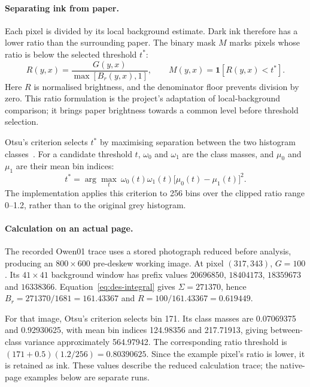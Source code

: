 \paragraph{Separating ink from paper.}
Each pixel is divided by its local background estimate. Dark ink therefore has a lower ratio than the surrounding paper. The binary mask $M$ marks pixels whose ratio is below the selected threshold $t^*$:
\begin{equation}
R(y,x)=\frac{G(y,x)}{\max[B_r(y,x),1]},\qquad
M(y,x)=\mathbf{1}[R(y,x)<t^*].
\label{eq:des-ratio}
\end{equation}
Here $R$ is normalised brightness, and the denominator floor prevents division by zero. This ratio formulation is the project's adaptation of local-background comparison; it brings paper brightness towards a common level before threshold selection.

Otsu's criterion selects $t^*$ by maximising separation between the two histogram classes~\cite{otsu1979}. For a candidate threshold $t$, $\omega_0$ and $\omega_1$ are the class masses, and $\mu_0$ and $\mu_1$ are their mean bin indices:
\begin{equation}
t^*=\arg\max_t\ \omega_0(t)\omega_1(t)
\bigl[\mu_0(t)-\mu_1(t)\bigr]^2.
\label{eq:des-otsu}
\end{equation}
The implementation applies this criterion to 256 bins over the clipped ratio range 0--1.2, rather than to the original grey histogram.

\paragraph{Calculation on an actual page.}
The recorded Owen01 trace uses a stored photograph reduced before analysis, producing an $800\times600$ pre-deskew working image. At pixel $(317,343)$, $G=100$. Its $41\times41$ background window has prefix values $20696850$, $18404173$, $18359673$ and $16338366$. Equation~\ref{eq:des-integral} gives $\Sigma=271370$, hence $B_r=271370/1681=161.43367$ and $R=100/161.43367=0.619449$.

For that image, Otsu's criterion selects bin 171. Its class masses are 0.07069375 and 0.92930625, with mean bin indices 124.98356 and 217.71913, giving between-class variance approximately 564.97942. The corresponding ratio threshold is $(171+0.5)(1.2/256)=0.80390625$. Since the example pixel's ratio is lower, it is retained as ink. These values describe the reduced calculation trace; the native-page examples below are separate runs.

